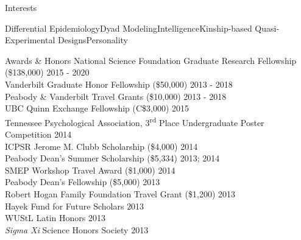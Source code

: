 \documentclass {resume}
\newcommand{\bigcdot}{\hspace* {.8 mm}{\Large$\cdot$}\hspace* {.8 mm}}
\begin{document}
\begin{rSection}{\textrm{Interests}} \begin{center}Differential Epidemiology\bigcdot Dyad Modeling\bigcdot Intelligence\bigcdot Kinship-based Quasi-Experimental Designs\bigcdot Personality\end{center}
\end{rSection}
\begin{rSection}{\textrm{Awards \& Honors}}
National Science Foundation Graduate Research Fellowship (\$138,000) \hfill{2015 - 2020}\smallskip\\
Vanderbilt Graduate Honor Fellowship (\$50,000)	\hfill  {2013 - 2018}\smallskip\\	
Peabody \& Vanderbilt Travel Grants (\$10,000)      \hfill  {2013 - 2018}\smallskip\\
UBC Quinn Exchange Fellowship (C\$3,000) \hfill{2015}\smallskip\\
Tennessee Psychological Association, 3\textsuperscript{rd} Place Undergraduate Poster Competition \hfill{2014}\smallskip\\
ICPSR Jerome M. Clubb Scholarship (\$4,000) \hfill{2014}\smallskip\\
Peabody Dean's Summer Scholarship (\$5,334)			    \hfill  {2013; 2014}\smallskip\\	
SMEP Workshop Travel Award (\$1,000) \hfill{2014}\smallskip\\
Peabody Dean's Fellowship (\$5,000)					\hfill  {2013}\smallskip\\
Robert Hogan Family Foundation Travel Grant (\$1,200) 	\hfill  {2013}\smallskip\\
Hayek Fund for Future Scholars                      \hfill  {2013}\smallskip\\
WUStL Latin Honors \hfill  {2013}\smallskip\\
\textit{Sigma Xi} Science Honors Society                    			\hfill  {2013}%
\end{rSection}
\end{document}

